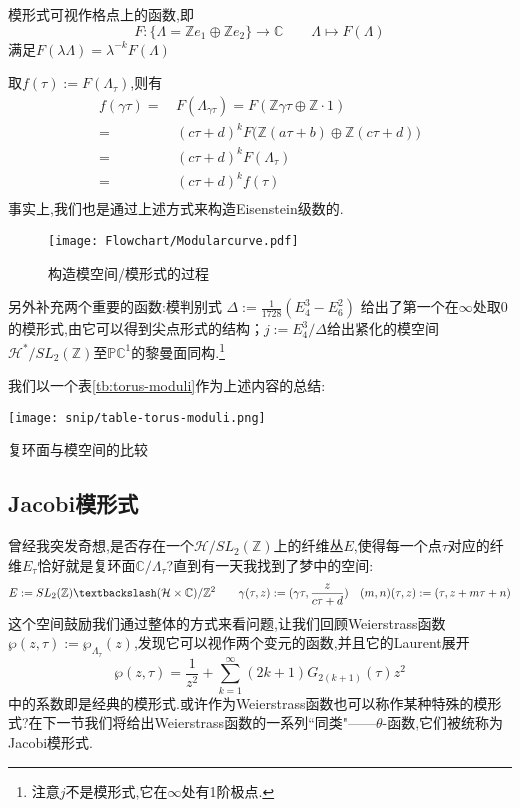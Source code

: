 \begin{remark}
	模形式可视作格点上的函数,即
	$$F: \{\Lambda= \mathbb{Z}e_1 \oplus \mathbb{Z}e_2 \} \longrightarrow \mathbb{C} \qquad \Lambda \longmapsto F(\Lambda)$$
	满足$F(\lambda \Lambda)= \lambda^{-k} F(\Lambda)$
	
	取$f(\tau):=F(\Lambda_{\tau})$,则有
	\begin{equation*}
	\begin{aligned}
	f(\gamma \tau) =\, & F(\Lambda_{\gamma\tau})=F(\mathbb{Z}\gamma\tau \oplus \mathbb{Z} \!\cdot\!\! 1)\\
	=\,& (c\tau + d)^k F\big(\mathbb{Z}(a\tau+b) \oplus \mathbb{Z}(c\tau +d)\big)		\\
	=\,& (c\tau + d)^k F(\Lambda_{\tau})		\\
	=\,& (c\tau + d)^k f(\tau)		\\
	\end{aligned}
	\end{equation*}
	事实上,我们也是通过上述方式来构造Eisenstein级数的.
\end{remark}
\begin{figure}[ht]
		\centering
		\texttt{[image: Flowchart/Modularcurve.pdf]}
	\caption{构造模空间/模形式的过程}
	\label{pic:Modularcurve}
\end{figure}
另外补充两个重要的函数:模判别式
$\Delta:=\frac{1}{1728}(E_4^3-E_6^2)$
给出了第一个在$\infty$处取0的模形式,由它可以得到尖点形式的结构；$j:=E_4^3/\Delta$给出紧化的模空间$\mathcal{H}^*/SL_2(\mathbb{Z})$至$\mathbb{PC}^1$的黎曼面同构.\footnote{注意$j$不是模形式,它在$\infty$处有1阶极点.}

我们以一个表\ref{tb:torus-moduli}作为上述内容的总结:
\begin{table}[ht]
	\centering
	\texttt{[image: snip/table-torus-moduli.png]}
	\caption{复环面与模空间的比较}
	\label{tb:torus-moduli}
\end{table}
\subsection{Jacobi模形式}
曾经我突发奇想,是否存在一个$\mathcal{H}/SL_2(\mathbb{Z})$上的纤维丛$E$,使得每一个点$\tau$对应的纤维$E_\tau$恰好就是复环面$\mathbb{C}/\Lambda_{\tau}$?直到有一天我找到了梦中的空间:
$$E:=SL_2(\mathbb{Z})\textbackslash (\mathcal{H} \times \mathbb{C})/\mathbb{Z}^2 \qquad \gamma(\tau,z):= (\gamma \tau,\frac{z}{c\tau +d}) \quad (m,n)(\tau,z):=(\tau, z+m\tau+n)$$
这个空间鼓励我们通过整体的方式来看问题,让我们回顾Weierstrass函数$\wp(z,\tau):= \wp_{\Lambda_{\tau}}(z)$,发现它可以视作两个变元的函数,并且它的Laurent展开
$$\wp(z,\tau)=\frac{1}{z^2}+ \sum_{k=1}^{\infty}(2k+1) G_{2(k+1)}(\tau)z^2$$
中的系数即是经典的模形式.或许作为Weierstrass函数也可以称作某种特殊的模形式?在下一节我们将给出Weierstrass函数的一系列``同类"——$\theta$-函数,它们被统称为Jacobi模形式.

